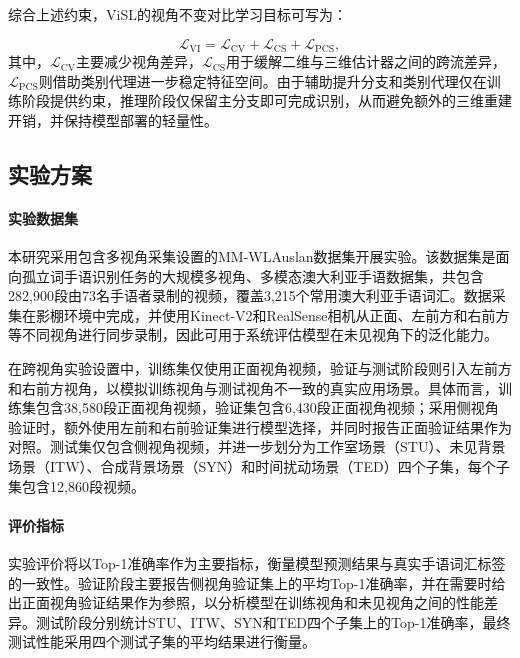 综合上述约束，ViSL的视角不变对比学习目标可写为：

\begin{equation}
    \mathcal{L}_{\mathrm{VI}}
    = \mathcal{L}_{\mathrm{CV}}
    + \mathcal{L}_{\mathrm{CS}}
    + \mathcal{L}_{\mathrm{PCS}},
    \label{eq:visl_lvi}
\end{equation}
其中，$\mathcal{L}_{\mathrm{CV}}$主要减少视角差异，$\mathcal{L}_{\mathrm{CS}}$用于缓解二维与三维估计器之间的跨流差异，$\mathcal{L}_{\mathrm{PCS}}$则借助类别代理进一步稳定特征空间。由于辅助提升分支和类别代理仅在训练阶段提供约束，推理阶段仅保留主分支即可完成识别，从而避免额外的三维重建开销，并保持模型部署的轻量性。

\subsection{实验方案}\label{subsec:geometric_prior_experiment}

\paragraph{实验数据集}

本研究采用包含多视角采集设置的MM-WLAuslan\citep{shen2024mm}数据集开展实验。该数据集是面向孤立词手语识别任务的大规模多视角、多模态澳大利亚手语数据集，共包含282,900段由73名手语者录制的视频，覆盖3,215个常用澳大利亚手语词汇。数据采集在影棚环境中完成，并使用Kinect-V2和RealSense相机从正面、左前方和右前方等不同视角进行同步录制，因此可用于系统评估模型在未见视角下的泛化能力。

在跨视角实验设置中，训练集仅使用正面视角视频，验证与测试阶段则引入左前方和右前方视角，以模拟训练视角与测试视角不一致的真实应用场景。具体而言，训练集包含38,580段正面视角视频，验证集包含6,430段正面视角视频；采用侧视角验证时，额外使用左前和右前验证集进行模型选择，并同时报告正面验证结果作为对照。测试集仅包含侧视角视频，并进一步划分为工作室场景（STU）、未见背景场景（ITW）、合成背景场景（SYN）和时间扰动场景（TED）四个子集，每个子集包含12,860段视频。

\paragraph{评价指标}

实验评价将以Top-1准确率作为主要指标，衡量模型预测结果与真实手语词汇标签的一致性。验证阶段主要报告侧视角验证集上的平均Top-1准确率，并在需要时给出正面视角验证结果作为参照，以分析模型在训练视角和未见视角之间的性能差异。测试阶段分别统计STU、ITW、SYN和TED四个子集上的Top-1准确率，最终测试性能采用四个测试子集的平均结果进行衡量。

